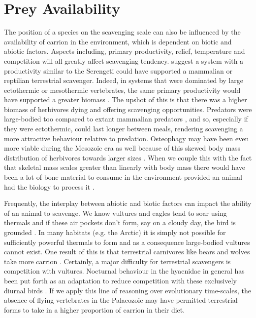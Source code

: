 \documentclass[a4paper,12pt]{article}
\begin{document}
\section*{Prey Availability}
The position of a species on the scavenging scale can also be influenced by the availability of carrion in the environment, which is dependent on biotic and abiotic factors.
Aspects including, primary productivity, relief, temperature and competition will all greatly affect scavenging tendency. 
\cite{ruxton2004obligate} suggest a system with a productivity similar to the Serengeti could have supported a mammalian or reptilian terrestrial scavenger.
Indeed, in systems that were dominated by large ectothermic or mesothermic vertebrates, the same primary productivity would have supported a greater biomass \citep{mcnab2009resources}.
The upshot of this is that there was a higher biomass of herbivores dying and offering scavenging opportunities.
Predators were large-bodied too compared to extant mammalian predators \citep{mcnab2009resources}, and so, especially if they were ectothermic, could last longer between meals, rendering scavenging a more attractive behaviour relative to predation.
Osteophagy may have been even more viable during the Mesozoic era as well because of this skewed body mass distribution of herbivores towards larger sizes \citep{10.1371/journal.pone.0051925}.
When we couple this with the fact that skeletal mass scales greater than linearly with body mass \citep{prange1979scaling} there would have been a lot of bone material to consume in the environment provided an animal had the biology to process it \citep{chure1997one}.

Frequently, the interplay between abiotic and biotic factors can impact the ability of an animal to scavenge. 
We know vultures and eagles tend to soar using thermals and if these air pockets don't form, say on a cloudy day, the bird is grounded \citep{mundy1992vultures}.
In many habitats (e.g. the Arctic) it is simply not possible for sufficiently powerful thermals to form and as a consequence large-bodied vultures cannot exist.
One result of this is that terrestrial carnivores like bears and wolves take more carrion \citep{devault2003scavenging}.
Certainly, a major difficulty for terrestrial scavengers is competition with vultures.
Nocturnal behaviour in the hyaenidae in general has been put forth as an adaptation to reduce competition with these exclusively diurnal birds \citep{gittleman2013carnivore}.
If we apply this line of reasoning over evolutionary time-scales, the absence of flying vertebrates in the Palaeozoic may have permitted terrestrial forms to take in a higher proportion of carrion in their diet.
\end{document}
